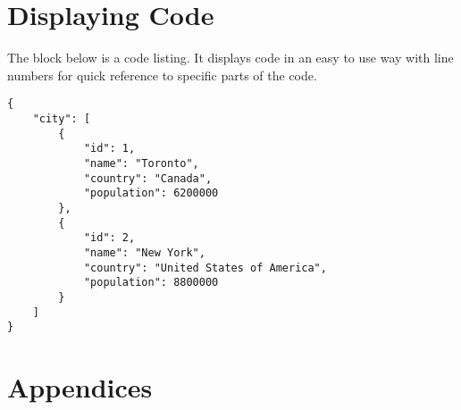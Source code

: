 \documentclass[
	letterpaper, %
	12pt, %
]{CSSullivanBusinessReport}
\begin{document}
\section{Displaying Code}

The block below is a code listing. It displays code in an easy to use way with line numbers for quick reference to specific parts of the code.

\begin{lstlisting}
{
	"city": [
		{
			"id": 1,
			"name": "Toronto",
			"country": "Canada",
			"population": 6200000
		},
		{
			"id": 2,
			"name": "New York",
			"country": "United States of America",
			"population": 8800000
		}
	]
}
\end{lstlisting}


\newpage


\begin{twothirdswidth} %
	\printbibliography[title=Reference List] %
\end{twothirdswidth}


\newpage

\section*{Appendices}
\end{document}
